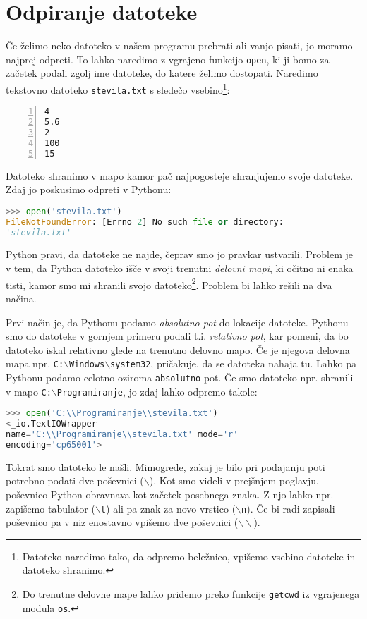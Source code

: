 \section{Odpiranje datoteke}

Če želimo neko datoteko v našem programu prebrati ali vanjo pisati, jo moramo najprej odpreti. To lahko naredimo z vgrajeno funkcijo \texttt{open}, ki ji bomo za začetek podali zgolj ime datoteke, do katere želimo dostopati. Naredimo tekstovno datoteko \texttt{stevila.txt} s sledečo vsebino\footnote{Datoteko naredimo tako, da odpremo beležnico, vpišemo vsebino datoteke in datoteko shranimo.}:
\begin{lstlisting}[showstringspaces=false,numbers=left]
4
5.6
2
100
15
\end{lstlisting}
Datoteko shranimo v mapo kamor pač najpogosteje shranjujemo svoje datoteke. Zdaj jo poskusimo odpreti v Pythonu:
\begin{lstlisting}[language=Python, showstringspaces=false]
>>> open('stevila.txt')
FileNotFoundError: [Errno 2] No such file or directory: 
'stevila.txt'
\end{lstlisting}
Python pravi, da datoteke ne najde, čeprav smo jo pravkar ustvarili. Problem je v tem, da Python datoteko išče v svoji trenutni \emph{delovni mapi}, ki očitno ni enaka tisti, kamor smo mi shranili svojo datoteko\footnote{Do trenutne delovne mape lahko pridemo preko funkcije \texttt{getcwd} iz vgrajenega modula \texttt{os}.}. Problem bi lahko rešili na dva načina.

Prvi način je, da Pythonu podamo \emph{absolutno pot} do lokacije datoteke. Pythonu smo do datoteke v gornjem primeru podali t.i. \emph{relativno pot}, kar pomeni, da bo datoteko iskal relativno glede na trenutno delovno mapo. Če je njegova delovna mapa npr. \texttt{C:$\backslash$Windows$\backslash$system32}, pričakuje, da se datoteka nahaja tu. Lahko pa Pythonu podamo celotno oziroma \texttt{absolutno} pot. Če smo datoteko npr. shranili v mapo \texttt{C:$\backslash$Programiranje}, jo zdaj lahko odpremo takole:
\begin{lstlisting}[language=Python, showstringspaces=false]
>>> open('C:\\Programiranje\\stevila.txt')
<_io.TextIOWrapper
name='C:\\Programiranje\\stevila.txt' mode='r'
encoding='cp65001'>
\end{lstlisting}
Tokrat smo datoteko le našli. Mimogrede, zakaj je bilo pri podajanju poti potrebno podati dve poševnici (\texttt{$\backslash$}). Kot smo videli v prejšnjem poglavju, poševnico Python obravnava kot začetek posebnega znaka. Z njo lahko npr. zapišemo tabulator (\texttt{$\backslash$t}) ali pa znak za novo vrstico (\texttt{$\backslash$n}). Če bi radi zapisali poševnico pa v niz enostavno vpišemo dve poševnici (\texttt{$\backslash\backslash$}).


